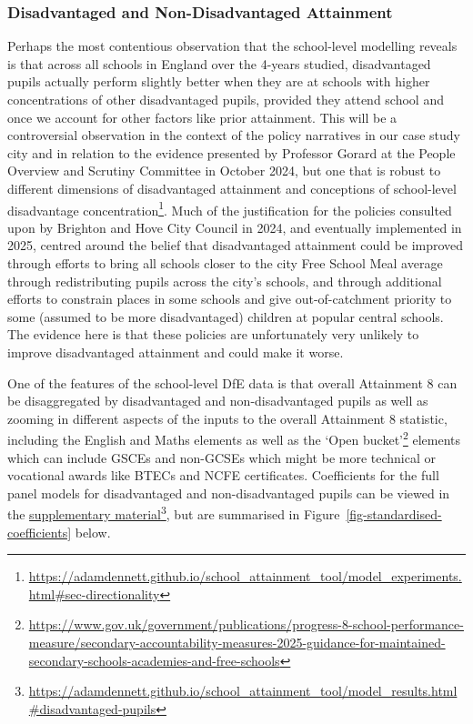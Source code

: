 \documentclass[
  11pt,
]{article}
\begin{document}
\subsubsection{Disadvantaged and Non-Disadvantaged
Attainment}\label{disadvantaged-and-non-disadvantaged-attainment}

Perhaps the most contentious observation that the school-level modelling
reveals is that across all schools in England over the 4-years studied,
disadvantaged pupils actually perform slightly better when they are at
schools with higher concentrations of other disadvantaged pupils,
provided they attend school and once we account for other factors like
prior attainment. This will be a controversial observation in the
context of the policy narratives in our case study city and in relation
to the evidence presented by Professor Gorard at the People Overview and
Scrutiny Committee in October 2024, but one that is robust to different
dimensions of disadvantaged attainment and conceptions of school-level
disadvantage concentration\footnote{\url{https://adamdennett.github.io/school_attainment_tool/model_experiments.html\#sec-directionality}}.
Much of the justification for the policies consulted upon by Brighton
and Hove City Council in 2024, and eventually implemented in 2025,
centred around the belief that disadvantaged attainment could be
improved through efforts to bring all schools closer to the city Free
School Meal average through redistributing pupils across the city's
schools, and through additional efforts to constrain places in some
schools and give out-of-catchment priority to some (assumed to be more
disadvantaged) children at popular central schools. The evidence here is
that these policies are unfortunately very unlikely to improve
disadvantaged attainment and could make it worse.

One of the features of the school-level DfE data is that overall
Attainment 8 can be disaggregated by disadvantaged and non-disadvantaged
pupils as well as zooming in different aspects of the inputs to the
overall Attainment 8 statistic, including the English and Maths elements
as well as the `Open bucket'\footnote{\url{https://www.gov.uk/government/publications/progress-8-school-performance-measure/secondary-accountability-measures-2025-guidance-for-maintained-secondary-schools-academies-and-free-schools}}
elements which can include GSCEs and non-GCSEs which might be more
technical or vocational awards like BTECs and NCFE certificates.
Coefficients for the full panel models for disadvantaged and
non-disadvantaged pupils can be viewed in the
\href{https://adamdennett.github.io/school_attainment_tool/model_results.html\#disadvantaged-pupils}{supplementary
material}\footnote{\url{https://adamdennett.github.io/school_attainment_tool/model_results.html\#disadvantaged-pupils}},
but are summarised in Figure~\ref{fig-standardised-coefficients} below.
\end{document}
